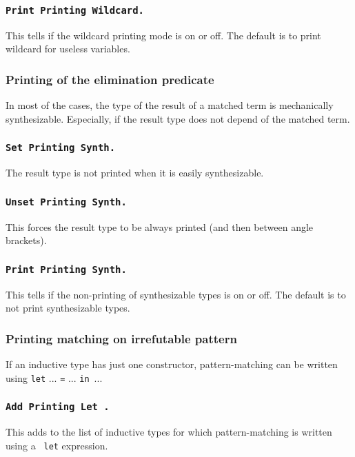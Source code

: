\begin{coq_example}
\subsubsection{\tt Print Printing Wildcard.}
This tells if the wildcard
printing mode is on or off. The default is to print wildcard for
useless variables.

\subsubsection{Printing of the elimination predicate}

In most of the cases, the type of the result of a matched term is
mechanically synthesizable. Especially, if the result type does not
depend of the matched term.

\subsubsection{\tt Set Printing Synth.}
The result type is not printed
when it is easily synthesizable.

\subsubsection{\tt Unset Printing Synth.}
This forces the result type to be always printed (and then between
angle brackets).

\subsubsection{\tt Print Printing Synth.}
This tells if the non-printing
of synthesizable types is on or off. The default is to not print 
synthesizable types.

\subsubsection{Printing matching on irrefutable pattern}

If an inductive type has just one constructor,
pattern-matching can be written using {\tt let} ... {\tt =}
... {\tt in}~...

\subsubsection{\tt Add Printing Let {\ident}.}
This adds {\ident} to the list
of inductive types for which pattern-matching is written using a {\tt
let} expression.


\end{coq_example}
